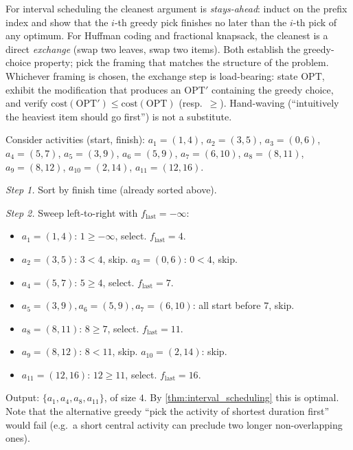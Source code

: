 \begin{remark}
For interval scheduling the cleanest argument is \emph{stays-ahead}: induct on the prefix index and show that the $i$-th greedy pick finishes no later than the $i$-th pick of any optimum. For Huffman coding and fractional knapsack, the cleanest is a direct \emph{exchange} (swap two leaves, swap two items). Both establish the greedy-choice property; pick the framing that matches the structure of the problem. Whichever framing is chosen, the exchange step is load-bearing: state $\mathrm{OPT}$, exhibit the modification that produces an $\mathrm{OPT}'$ containing the greedy choice, and verify $\mathrm{cost}(\mathrm{OPT}') \le \mathrm{cost}(\mathrm{OPT})$ (resp.\ $\ge$). Hand-waving (``intuitively the heaviest item should go first'') is not a substitute.
\end{remark}

\begin{example}
\label{ex:interval_scheduling_run}
Consider activities (start, finish): $a_1 = (1,4)$, $a_2 = (3,5)$, $a_3 = (0,6)$, $a_4 = (5,7)$, $a_5 = (3,9)$, $a_6 = (5,9)$, $a_7 = (6,10)$, $a_8 = (8,11)$, $a_9 = (8,12)$, $a_{10} = (2,14)$, $a_{11} = (12,16)$.

\medskip
\noindent\textit{Step 1.} Sort by finish time (already sorted above).

\medskip
\noindent\textit{Step 2.} Sweep left-to-right with $f_{\mathrm{last}} = -\infty$:
\begin{itemize}
  \item $a_1=(1,4)$: $1 \ge -\infty$, select. $f_{\mathrm{last}}=4$.
  \item $a_2=(3,5)$: $3 < 4$, skip. $a_3=(0,6)$: $0<4$, skip.
  \item $a_4=(5,7)$: $5 \ge 4$, select. $f_{\mathrm{last}}=7$.
  \item $a_5=(3,9), a_6=(5,9), a_7=(6,10)$: all start before $7$, skip.
  \item $a_8=(8,11)$: $8 \ge 7$, select. $f_{\mathrm{last}}=11$.
  \item $a_9=(8,12)$: $8 < 11$, skip. $a_{10}=(2,14)$: skip.
  \item $a_{11}=(12,16)$: $12 \ge 11$, select. $f_{\mathrm{last}}=16$.
\end{itemize}
Output: $\{a_1, a_4, a_8, a_{11}\}$, of size $4$. By \cref{thm:interval_scheduling} this is optimal. Note that the alternative greedy ``pick the activity of shortest duration first'' would fail (e.g.\ a short central activity can preclude two longer non-overlapping ones).
\end{example}

